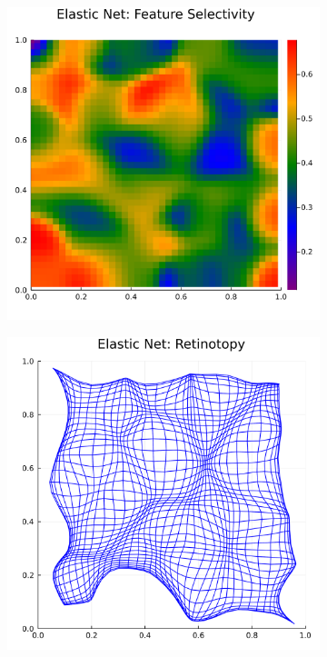 \begin{figure}
	\begin{subfigure}{0.5\textwidth}
		\centering
		\includegraphics[width=\textwidth]{images/elastic_neighbourhood/fig_elastic_net_feature}
		\caption{}
	\end{subfigure}
	\begin{subfigure}{0.5\textwidth}
		\centering
		\includegraphics[width=\textwidth]{images/elastic_neighbourhood/fig_elastic_net_retinotopy}

\end{subfigure}
\end{figure}
